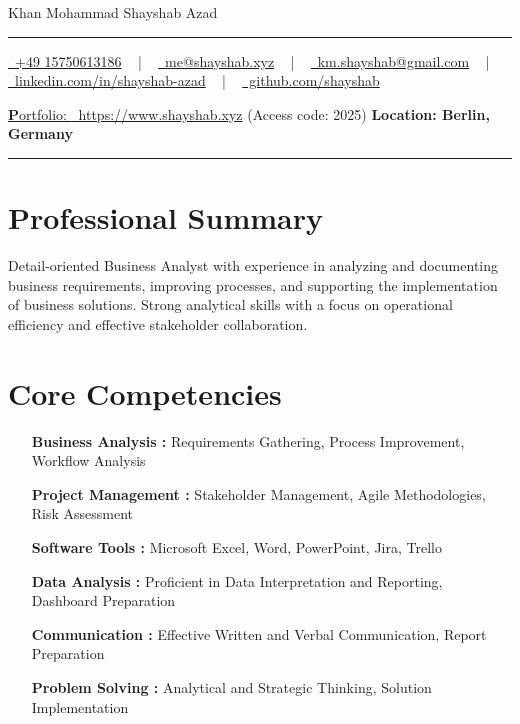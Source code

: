 \documentclass[letterpaper,10pt]{article}
\newcommand{\documentTitle}[2]{
  \begin{center}
    {\Huge\color{accentTitle} #1}
    \vspace{10pt}
    {\color{accentLine} \hrule}
    \vspace{2pt}
    \footnotesize{#2}
    \vspace{2pt}
    {\color{accentLine} \hrule}
  \end{center}
}
\begin{document}
  \documentTitle{Khan Mohammad Shayshab Azad}{
    \href{tel:+49 15750613186}{
      \raisebox{-0.05\height} \faPhone\ +49 15750613186} ~ | ~
      \href{mailto:km.shayshab@gmail.com}{
      \raisebox{-0.15\height} \faEnvelope\ me@shayshab.xyz} ~ | ~
    \href{mailto:me@shayshab.xyz}{
      \raisebox{-0.15\height} \faEnvelope\ km.shayshab@gmail.com} ~ | ~
    \href{https://linkedin.com/in/shayshab-azad/}{
      \raisebox{-0.15\height} \faLinkedin\ linkedin.com/in/shayshab-azad} ~ | ~
    \href { https://github.com/shayshab}{
      \raisebox{-0.15\height} \faGithub \ github.com/shayshab} 
     
      \href{https://www.shayshab.xyz/}{
      \raisebox{-0.15\height} {\textbf Portfolio: }\ https://www.shayshab.xyz}{ (Access code: 2025)}
    \textbf{ Location: Berlin, Germany}
  }

\section*{Professional Summary}
Detail-oriented Business Analyst with experience in analyzing and documenting business requirements, improving processes, and supporting the implementation of business solutions. Strong analytical skills with a focus on operational efficiency and effective stakeholder collaboration.

\section{Core Competencies}

  \begin{itemize}[itemsep=-2px, parsep=1pt, leftmargin=120 pt]
    \item[\textbf{Business Analysis :}] Requirements Gathering, Process Improvement, Workflow Analysis
    \item[\textbf{Project Management :}] Stakeholder Management, Agile Methodologies, Risk Assessment
    \item[\textbf{Software Tools :}] Microsoft Excel, Word, PowerPoint, Jira, Trello
    \item[\textbf{Data Analysis :}] Proficient in Data Interpretation and Reporting, Dashboard Preparation
    \item[\textbf{Communication :}] Effective Written and Verbal Communication, Report Preparation
    \item[\textbf{Problem Solving :}] Analytical and Strategic Thinking, Solution Implementation
  \end{itemize}
\end{document}
